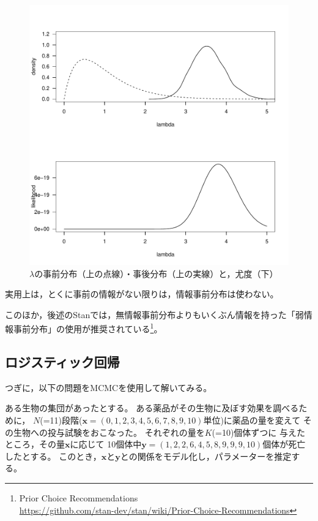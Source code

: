 \documentclass[11pt,uplatex]{jsarticle}
\begin{document}
\begin{figure}[htbp]
	\begin{center}
		\includegraphics[bb=0 0 480 480, clip, width=280 bp]{example1-4.pdf}
	\end{center}
	\caption{$\lambda$の事前分布（上の点線）・事後分布（上の実線）と，尤度（下）}
	\label{prior_posterior}
\end{figure}

実用上は，とくに事前の情報がない限りは，情報事前分布は使わない。

このほか，後述の\textsf{Stan}では，無情報事前分布よりもいくぶん情報を持った「弱情報事前分布」の使用が推奨されている\footnote{Prior Choice Recommendations\\ \url{https://github.com/stan-dev/stan/wiki/Prior-Choice-Recommendations}}。



\subsection{ロジスティック回帰}
\label{logistic}


つぎに，以下の問題をMCMCを使用して解いてみる。
\vspace{1zw}

\hspace{18mm}
\begin{minipage}{100mm}
\begin{breakbox}
\noindent
ある生物の集団があったとする。
ある薬品がその生物に及ぼす効果を調べるために，
$N$(=11)段階($\bm{x} = (0, 1, 2, 3, 4, 5, 6, 7, 8, 9, 10)$単位)に薬品の量を変えて
その生物への投与試験をおこなった。
それぞれの量を$K$(=10)個体ずつに
与えたところ，その量$\bm{x}$に応じて
10個体中$\bm{y} = (1, 2, 2, 6, 4, 5, 8, 9, 9, 9, 10)$個体が死亡したとする。
このとき，$\bm{x}$と$\bm{y}$との関係をモデル化し，パラメーターを推定する。
\end{breakbox}
\end{minipage}
\vspace{1zw}
\end{document}
